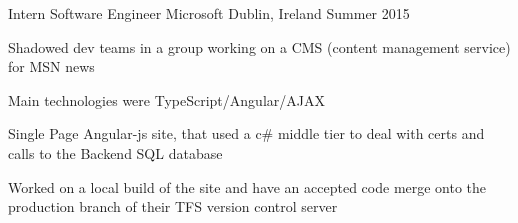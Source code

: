 

\begin{cventries}

  \cventry
    {Intern Software Engineer} %
    {Microsoft} %
    {Dublin, Ireland} %
    {Summer 2015} %
    {
      \begin{cvitems} %
        \item {Shadowed dev teams in a group working on a CMS (content management service) for MSN news}
        \item {Main technologies were TypeScript/Angular/AJAX}
        \item {Single Page Angular-js site, that used a c\# middle tier to deal with certs and calls to the Backend SQL database}
        \item {Worked on a local build of the site and have an accepted code merge onto the production branch of their TFS version control server}
      \end{cvitems}
    }



\end{cventries}
